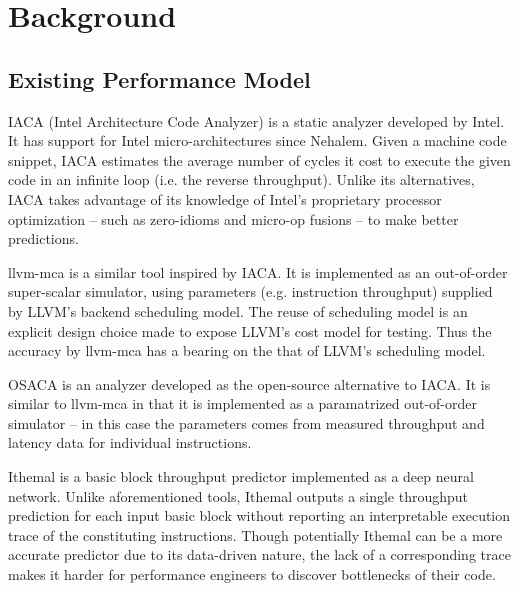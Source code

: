 \section{Background}

\subsection{Existing Performance Model}
IACA (Intel Architecture Code Analyzer) is a static analyzer
developed by Intel. It has support for Intel micro-architectures
since Nehalem.
Given a machine code snippet, IACA estimates the average number
of cycles it cost to execute the given code in an infinite 
loop (i.e. the reverse throughput).
Unlike its alternatives, IACA takes advantage of its knowledge
of Intel's proprietary processor optimization
-- such as zero-idioms and micro-op fusions -- to make better 
predictions.

llvm-mca is a similar tool inspired by IACA. 
It is implemented as an out-of-order super-scalar simulator,
using parameters (e.g. instruction throughput)
supplied by LLVM\cite{llvm}'s backend scheduling model.
The reuse of scheduling model is an explicit design choice
made to expose LLVM's cost model for testing.
Thus the accuracy by llvm-mca has a bearing on the 
that of LLVM's scheduling model.

OSACA\cite{osaca} is an analyzer developed as the open-source
alternative to IACA. It is similar to llvm-mca in that
it is implemented as a paramatrized out-of-order simulator
-- in this case the parameters comes from measured throughput
and latency data for individual instructions.

Ithemal\cite{ithemal} is a basic block throughput predictor
implemented as a deep neural network. Unlike aforementioned 
tools, Ithemal outputs a single throughput prediction for each
input basic block without reporting an interpretable execution
trace of the constituting instructions.
Though potentially Ithemal can be a more accurate predictor
due to its data-driven nature, the lack of a corresponding 
trace makes it harder for performance engineers to discover
bottlenecks of their code.

